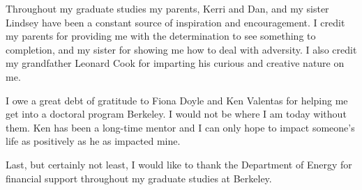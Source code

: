 \documentclass{ucbthesis}
\begin{document}
\begin{frontmatter}
\begin{acknowledgements}
  Throughout my graduate studies my parents, Kerri and Dan, and my sister Lindsey have been a constant source of inspiration and encouragement. I credit my parents for providing me with the determination to see something to completion, and my sister for showing me how to deal with adversity. I also credit my grandfather Leonard Cook for imparting his curious and creative nature on me.

  I owe a great debt of gratitude to Fiona Doyle and Ken Valentas for helping me get into a doctoral program Berkeley. I would not be where I am today without them. Ken has been a long-time mentor and I can only hope to impact someone’s life as positively as he as impacted mine.

  Last, but certainly not least, I would like to thank the Department of Energy for financial support throughout my graduate studies at Berkeley.

\end{acknowledgements}

\end{frontmatter}

\pagestyle{headings}






%
%

\appendix


\printbibliography
\end{document}
